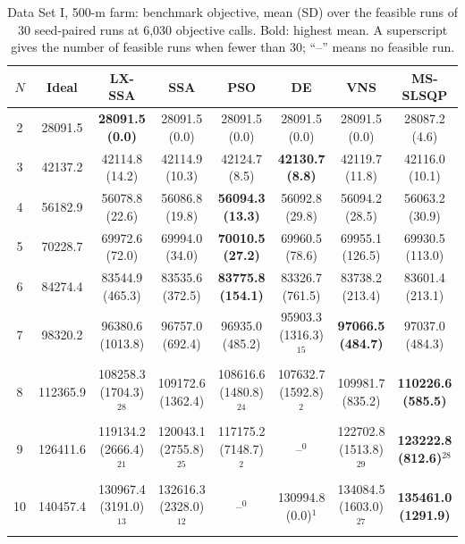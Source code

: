\begin{table}[!t]
\centering
\caption{Data Set I, 500-m farm: benchmark objective, mean (SD) over the feasible runs of 30 seed-paired runs at 6,030 objective calls. Bold: highest mean. A superscript gives the number of feasible runs when fewer than 30; ``--'' means no feasible run.}
\label{tab:res-1-500}
\scriptsize\setlength{\tabcolsep}{3pt}
\begin{tabular}{cccccccc}
\toprule
$N$ & Ideal & LX-SSA & SSA & PSO & DE & VNS & MS-SLSQP \\
\midrule
2 & 28091.5 & \textbf{28091.5 (0.0)} & 28091.5 (0.0) & 28091.5 (0.0) & 28091.5 (0.0) & 28091.5 (0.0) & 28087.2 (4.6) \\
3 & 42137.2 & 42114.8 (14.2) & 42114.9 (10.3) & 42124.7 (8.5) & \textbf{42130.7 (8.8)} & 42119.7 (11.8) & 42116.0 (10.1) \\
4 & 56182.9 & 56078.8 (22.6) & 56086.8 (19.8) & \textbf{56094.3 (13.3)} & 56092.8 (29.8) & 56094.2 (28.5) & 56063.2 (30.9) \\
5 & 70228.7 & 69972.6 (72.0) & 69994.0 (34.0) & \textbf{70010.5 (27.2)} & 69960.5 (78.6) & 69955.1 (126.5) & 69930.5 (113.0) \\
6 & 84274.4 & 83544.9 (465.3) & 83535.6 (372.5) & \textbf{83775.8 (154.1)} & 83326.7 (761.5) & 83738.2 (213.4) & 83601.4 (213.1) \\
7 & 98320.2 & 96380.6 (1013.8) & 96757.0 (692.4) & 96935.0 (485.2) & 95903.3 (1316.3)$^{15}$ & \textbf{97066.5 (484.7)} & 97037.0 (484.3) \\
8 & 112365.9 & 108258.3 (1704.3)$^{28}$ & 109172.6 (1362.4) & 108616.6 (1480.8)$^{24}$ & 107632.7 (1592.8)$^{2}$ & 109981.7 (835.2) & \textbf{110226.6 (585.5)} \\
9 & 126411.6 & 119134.2 (2666.4)$^{21}$ & 120043.1 (2755.8)$^{25}$ & 117175.2 (7148.7)$^{2}$ & --$^{0}$ & 122702.8 (1513.8)$^{29}$ & \textbf{123222.8 (812.6)}$^{28}$ \\
10 & 140457.4 & 130967.4 (3191.0)$^{13}$ & 132616.3 (2328.0)$^{12}$ & --$^{0}$ & 130994.8 (0.0)$^{1}$ & 134084.5 (1603.0)$^{27}$ & \textbf{135461.0 (1291.9)} \\
\bottomrule
\end{tabular}
\end{table}

